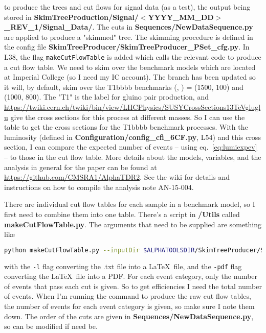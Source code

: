 to produce the trees and cut flows for signal data (as a test), the output being stored in \textbf{SkimTreeProduction/Signal/$<$YYYY\_MM\_DD$>$\_REV\_1/Signal\_Data/}. The cuts in \textbf{Sequences/NewDataSequence.py} are applied to produce a "skimmed" tree. The skimming procedure is defined in the config file \textbf{SkimTreeProducer/SkimTreeProducer\_PSet\_cfg.py}. In L38, the flag \texttt{makeCutFlowTable} is added which calls the relevant code to produce a cut flow table. We need to skim over the benchmark models which are located at Imperial College (so I need my IC account). The branch has been updated so it will, by default, skim over the T1bbbb benchmarks (\mSUSY, \mLSP) = (1500, 100) and (1000, 800). The "T1" is the label for gluino pair production, and \url{https://twiki.cern.ch/twiki/bin/view/LHCPhysics/SUSYCrossSections13TeVgluglu} give the cross sections for this process at different masses. So I can use the table to get the cross sections for the T1bbbb benchmark processes. With the luminosity (defined in \textbf{Configuration/config\_cfi\_6CF.py}, L54) and this cross section, I can compare the expected number of events -- using eq.~\ref{eq:lumiexpev} -- to those in the cut flow table. More details about the models, variables, and the analysis in general for the paper can be found at \url{https://github.com/CMSRA1/AlphaTDR2}. See the wiki for details and instructions on how to compile the analysis note AN-15-004.

There are individual cut flow tables for each sample in a benchmark model, so I first need to combine them into one table. There's a script in \textbf{/Utils} called \textbf{makeCutFlowTable.py}. The arguments that need to be supplied are something like

\begin{lstlisting}[belowskip=-0.7cm, language=sh, numbers=none]
python makeCutFlowTable.py --inputDir $ALPHATOOLSDIR/SkimTreeProducer/SkimTreeProduction/Signal/2017_01_25_REV_1/Signal_Data/ --process Signal_Run2015D_25ns -l -pdf
\end{lstlisting}

with the \texttt{-l} flag converting the .txt file into a \LaTeX\ file, and the \texttt{-pdf} flag converting the \LaTeX\ file into a PDF. For each event category, only the number of events that pass each cut is given. So to get efficiencies I need the total number of events. When I'm running the command to produce the raw cut flow tables, the number of events for each event category is given, so make sure I note them down. The order of the cuts are given in \textbf{Sequences/NewDataSequence.py}, so can be modified if need be.

